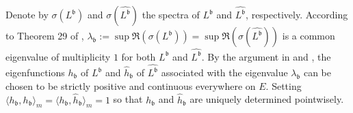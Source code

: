 \documentclass[12pt,a4paper]{amsart}
\numberwithin{equation}{section}
\theoremstyle{plain}
\theoremstyle{definition}
\theoremstyle{remark}
\begin{document}
	Denote by $\sigma(L^\mathfrak b)$ and $\sigma(\widehat{L^\mathfrak b})$ the spectra of $L^\mathfrak b$ and $\widehat {L^{\mathfrak b}}$, respectively.
	According to Theorem 29 of \cite{Schaefer1974Banach}, $\lambda_\mathfrak b:= \sup \Re(\sigma(L^\mathfrak b)) = \sup \Re(\sigma( \widehat{L^\mathfrak b})) $ is a common eigenvalue of multiplicity $1$ for both $L^\mathfrak b$ and $\widehat {L^{\mathfrak b}}$.
	By the argument in \cite{RenSongZhang2015Limit} and \cite{RenSongZhang2017Central}, the eigenfunctions $h_\mathfrak b$ of $L^\mathfrak b$ and $\widehat h_\mathfrak b$ of $\widehat{L^\mathfrak b}$ associated with the eigenvalue $\lambda_\mathfrak b$ can be chosen to be strictly positive and continuous everywhere on $E$.
	Setting $\langle h_\mathfrak b,h_\mathfrak b\rangle_m = \langle h_\mathfrak b, \widehat h_\mathfrak b\rangle_m = 1$ so that $h_\mathfrak b$ and $\widehat h_\mathfrak b$ are uniquely determined pointwisely.
\end{document}
